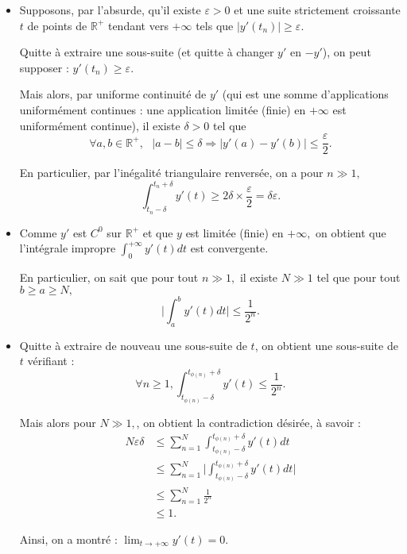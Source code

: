 \begin{itemize}
\item Supposons, par l'absurde, qu'il existe $\varepsilon>0$ et une suite strictement croissante $t$ de points de $\mathbb{R}^{+}$ tendant vers $+\infty$ tels que $\displaystyle \vert y'(t_{n}) \vert \geq \varepsilon.$

Quitte à extraire une sous-suite (et quitte à changer $y'$ en $-y'$), on peut supposer : $\displaystyle y'(t_{n})\geq \varepsilon.$

Mais alors, par uniforme continuité de $y'$ (qui est une somme d'applications uniformément continues : une application limitée (finie) en $+\infty$ est uniformément continue), il existe $\delta>0$ tel que $$\forall a,b\in \mathbb{R}^{+},\mbox{ } \vert a-b\vert \leq \delta \Longrightarrow \vert y'(a)-y'(b)\vert \leq \frac{\varepsilon}{2}.$$

En particulier, par l'inégalité triangulaire renversée, on a pour $n\gg1,$ $$\int_{t_{n}-\delta}^{t_{n}+\delta}y'(t)\geq 2\delta\times \frac{\varepsilon}{2}=\delta\varepsilon.$$

\item Comme $y'$ est $C^{0}$ sur $\mathbb{R}^{+}$ et que $y$ est limitée (finie) en $+\infty,$ on obtient que l'intégrale impropre $\displaystyle \int_{0}^{+\infty}y'(t)dt$ est convergente.

En particulier, on sait que pour tout $n\gg 1,$ il existe $N\gg 1$ tel que pour tout $b\geq a \geq N,$ $$\vert \int_{a}^{b}y'(t)dt\vert \leq \frac{1}{2^{n}}.$$

\item Quitte à extraire de nouveau une sous-suite de $t$, on obtient une sous-suite de $t$ vérifiant :
$$\forall n\geq 1, \int_{t_{\phi(n)}-\delta}^{t_{\phi(n)}+\delta}y'(t)\leq \frac{1}{2^{n}}.$$

Mais alors pour $N\gg 1,$, on obtient la contradiction désirée, à savoir : 
\begin{align*}
N\varepsilon \delta & \leq \sum_{n=1}^{N}\int_{t_{\phi(n)}-\delta}^{t_{\phi(n)}+\delta}y'(t)dt\\
& \leq \sum_{n=1}^{N} \vert \int_{t_{\phi(n)}-\delta}^{t_{\phi(n)}+\delta}y'(t)dt \vert \\
& \leq \sum_{n=1}^{N}\frac{1}{2^{n}}\\
& \leq 1.
\end{align*}

Ainsi, on a montré : $\displaystyle \lim_{t\rightarrow +\infty}y'(t)=0.$

\end{itemize}
